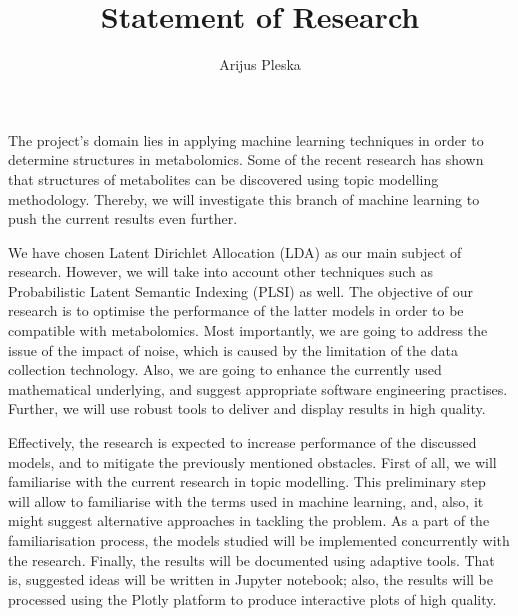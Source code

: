 \documentclass{article}
\title{Statement of Research}
\author{Arijus Pleska}
\begin{document}
\maketitle

\par The project's domain lies in applying machine learning techniques in order to determine structures in metabolomics. Some of the recent research \cite{Rogers} has shown that structures of metabolites can be discovered using topic modelling methodology. 
Thereby, we will investigate this branch of machine learning to push the current results even further. 

\par We have chosen Latent Dirichlet Allocation (LDA) \cite{Blei} as our main subject of research. However, we will take into account other techniques such as Probabilistic Latent Semantic Indexing (PLSI) \cite{Hofmann} as well. The objective of our research is to optimise the performance of the latter models in order to be compatible with metabolomics. Most importantly, we are going to address the issue of the impact of noise, which is caused by the limitation of the data collection technology. Also, we are going to enhance the currently used mathematical underlying, and suggest appropriate software engineering practises. Further, we will use robust tools to deliver and display results in high quality. 

\par Effectively, the research is expected to increase performance of the discussed models, and to mitigate the previously mentioned obstacles. First of all, we will familiarise with the current research in topic modelling. This preliminary step will allow to familiarise with the terms used in machine learning, and, also, it might suggest alternative approaches in tackling the problem. As a part of the familiarisation process, the models studied will be implemented concurrently with the research. Finally, the results will be documented using adaptive tools. That is, suggested ideas will be written in Jupyter notebook; also, the results will be processed using the Plotly platform to produce interactive plots of high quality. 
 

{}

\end{document}
